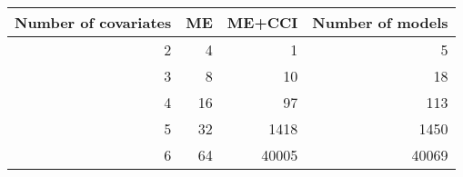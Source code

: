 \begin{table}[!h]
\centering
\caption{} 
\begin{tabular}{rrrr}
  \hline
Number of covariates & ME & ME+CCI & Number of models \\ 
  \hline
2 & 4 & 1 & 5 \\ 
  3 & 8 & 10 & 18 \\ 
  4 & 16 & 97 & 113 \\ 
  5 & 32 & 1418 & 1450 \\ 
  6 & 64 & 40005 & 40069 \\ 
   \hline
\end{tabular}
\end{table}
